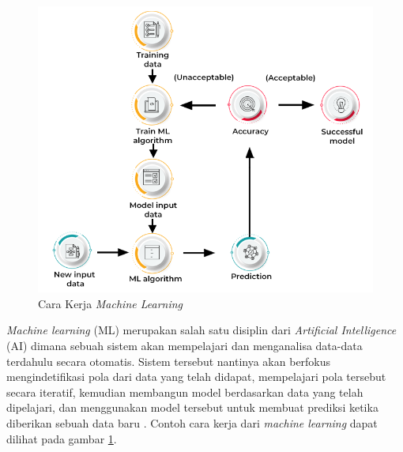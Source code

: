 \begin{figure}[ht]
  \centering
  \includegraphics[scale=0.5]{gambar/How Machine learning work.png}
  \caption{Cara Kerja \emph{Machine Learning}}
  \label{fig:carakerjamachinelearning}
\end{figure}

\emph{Machine learning} (ML) merupakan salah satu disiplin dari \emph{Artificial Intelligence} (AI) dimana sebuah sistem akan 
mempelajari dan menganalisa data-data terdahulu secara otomatis. Sistem tersebut nantinya akan berfokus mengindetifikasi 
pola dari data yang telah didapat, mempelajari pola tersebut secara iteratif, kemudian membangun model berdasarkan data 
yang telah dipelajari, dan menggunakan model tersebut untuk membuat prediksi ketika diberikan sebuah data baru \parencite{Russel2021}. 
Contoh cara kerja dari \emph{machine learning} dapat dilihat pada gambar \ref{fig:carakerjamachinelearning}.



